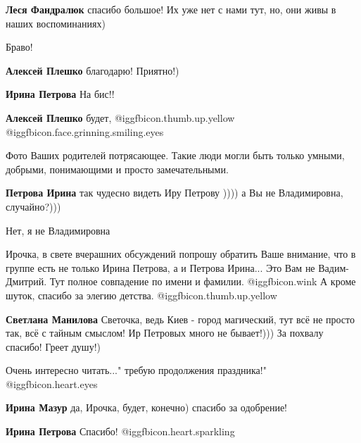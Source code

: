 \begin{itemize}
\begin{itemize} %
\textbf{Леся Фандралюк} спасибо большое! Их уже нет с нами тут, но, они живы в наших воспоминаниях)
\end{itemize} %

Браво!

\begin{itemize} %
\textbf{Алексей Плешко} благодарю! Приятно!)

\textbf{Ирина Петрова} На бис!!

\textbf{Алексей Плешко} будет, @igg{fbicon.thumb.up.yellow}  @igg{fbicon.face.grinning.smiling.eyes} 
\end{itemize} %


Фото Ваших родителей потрясающее. Такие люди могли быть только умными, добрыми,
понимающими и просто замечательными.

\begin{itemize} %
\textbf{Петрова Ирина} так чудесно видеть Иру Петрову )))) а Вы не Владимировна, случайно?)))

Нет, я не Владимировна
\end{itemize} %


Ирочка, в свете вчерашних обсуждений попрошу обратить Ваше внимание, что в
группе есть не только Ирина Петрова, а и Петрова Ирина... Это Вам не Вадим-
Дмитрий. Тут полное совпадение по имени и фамилии.  @igg{fbicon.wink} А кроме шуток, спасибо за
элегию детства. @igg{fbicon.thumb.up.yellow}  

\begin{itemize} %
\textbf{Светлана Манилова} Светочка, ведь Киев - город магический, тут всё не просто так, всё с тайным смыслом! Ир Петровых много не бывает!))) За похвалу спасибо! Греет душу!)
\end{itemize} %


Очень интересно читать..." требую продолжения праздника!" @igg{fbicon.heart.eyes} 

\begin{itemize} %
\textbf{Ирина Мазур} да, Ирочка, будет, конечно) спасибо за одобрение!

\textbf{Ирина Петрова} Спасибо! @igg{fbicon.heart.sparkling} 
\end{itemize} %


\end{itemize}
